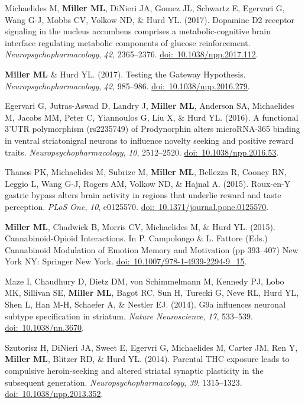 \documentclass[10pt]{article}
\begin{document}
\begin{description}
\item Michaelides M, \textbf{Miller ML}, DiNieri JA, Gomez JL, Schwartz E, Egervari G, Wang G-J, Mobbs CV, Volkow ND, \& Hurd YL. (2017). Dopamine D2 receptor signaling in the nucleus accumbens comprises a metabolic-cognitive brain interface regulating metabolic components of glucose reinforcement. \textit{Neuropsychopharmacology}, \textit{42}, 2365--2376. \href{https://doi.org/10.1038/npp.2017.112}{doi:~10.1038/npp.2017.112}.
\item \textbf{Miller ML} \& Hurd YL. (2017). Testing the Gateway Hypothesis. \textit{Neuropsychopharmacology}, \textit{42}, 985--986. \href{https://doi.org/10.1038/npp.2016.279}{doi:~10.1038/npp.2016.279}.
\item Egervari G, Jutras-Aswad D, Landry J, \textbf{Miller ML}, Anderson SA, Michaelides M, Jacobs MM, Peter C, Yiannoulos G, Liu X, \& Hurd YL. (2016). A functional 3’UTR polymorphism (rs2235749) of Prodynorphin alters microRNA-365 binding in ventral striatonigral neurons to influence novelty seeking and positive reward traits. \textit{Neuropsychopharmacology}, \textit{10}, 2512--2520. \href{https://doi.org/10.1038/npp.2016.53}{doi:~10.1038/npp.2016.53}.
\item Thanos PK, Michaelides M, Subrize M, \textbf{Miller ML}, Bellezza R, Cooney RN, Leggio L, Wang G-J, Rogers AM, Volkow ND, \& Hajnal A. (2015). Roux-en-Y gastric bypass alters brain activity in regions that underlie reward and taste perception. \textit{PLoS One}, \textit{10}, e0125570. \href{https://doi.org/10.1371/journal.pone.0125570}{doi:~10.1371/journal.pone.0125570}.
\item \textbf{Miller ML}, Chadwick B, Morris CV, Michaelides M, \& Hurd YL. (2015). Cannabinoid-Opioid Interactions. In P. Campolongo \& L. Fattore (Eds.) Cannabinoid Modulation of Emotion Memory and Motivation (pp 393--407) New York NY: Springer New York. \href{https://doi.org/10.1007/978-1-4939-2294-9_15}{doi:~10.1007/978-1-4939-2294-9\_15}.
\item Maze I, Chaudhury D, Dietz DM, von Schimmelmann M, Kennedy PJ, Lobo MK, Sillivan SE, \textbf{Miller ML}, Bagot RC, Sun H, Turecki G, Neve RL, Hurd YL, Shen L, Han M-H, Schaefer A, \& Nestler EJ. (2014). G9a influences neuronal subtype specification in striatum. \textit{Nature Neuroscience}, \textit{17}, 533--539. \href{https://doi.org/10.1038/nn.3670}{doi:~10.1038/nn.3670}.
\item Szutorisz H, DiNieri JA, Sweet E, Egervri G, Michaelides M, Carter JM, Ren Y, \textbf{Miller ML}, Blitzer RD, \& Hurd YL. (2014). Parental THC exposure leads to compulsive heroin-seeking and altered striatal synaptic plasticity in the subsequent generation. \textit{Neuropsychopharmacology}, \textit{39}, 1315--1323. \href{https://doi.org/10.1038/npp.2013.352}{doi:~10.1038/npp.2013.352}.

\end{description}
\end{document}
